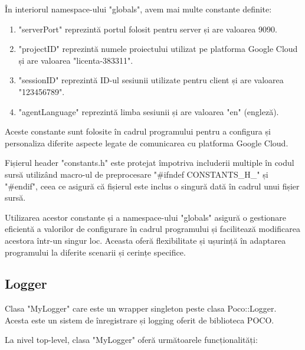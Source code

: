 În interiorul namespace-ului "globals", avem mai multe constante definite:
\begin{enumerate}
    \item "serverPort" reprezintă portul folosit pentru server și are valoarea 9090.
    \item "projectID" reprezintă numele proiectului utilizat pe platforma Google Cloud și are valoarea "licenta-383311".
    \item "sessionID" reprezintă ID-ul sesiunii utilizate pentru client și are valoarea "123456789".
    \item "agentLanguage" reprezintă limba sesiunii și are valoarea "en" (engleză).
\end{enumerate}

Aceste constante sunt folosite în cadrul programului pentru a configura și personaliza diferite aspecte legate de comunicarea cu platforma Google Cloud.

Fișierul header "constants.h" este protejat împotriva includerii multiple în codul sursă utilizând macro-ul de preprocesare "\#ifndef CONSTANTS\_H\_" și "\#endif", ceea ce asigură că fișierul este inclus o singură dată în cadrul unui fișier sursă.

Utilizarea acestor constante și a namespace-ului "globals" asigură o gestionare eficientă a valorilor de configurare în cadrul programului și facilitează modificarea acestora într-un singur loc. Aceasta oferă flexibilitate și ușurință în adaptarea programului la diferite scenarii și cerințe specifice.

\subsection{Logger}

Clasa "MyLogger" care este un wrapper singleton peste clasa Poco::Logger. Acesta este un sistem de înregistrare și logging oferit de biblioteca POCO. 

La nivel top-level, clasa "MyLogger" oferă următoarele funcționalități:

